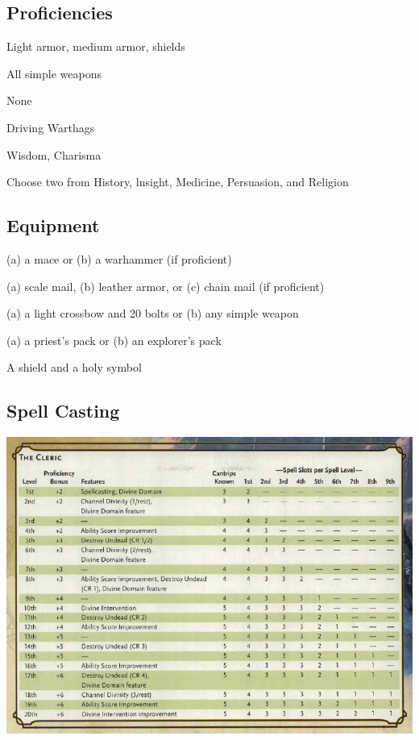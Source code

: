 \documentclass[letterpaper,10pt,twoside,twocolumn,openany]{book}
\begin{document}
\subsection{Proficiencies}

\begin{description}[font=\normalfont\textbf,noitemsep,topsep=1ex,leftmargin=1em]
	\item[Armor:] Light armor, medium armor, shields
	\item[Weapons:] All simple weapons
	\item[Tools:] None
	\item[Other:] Driving Warthags
\end{description}

\begin{description}[font=\normalfont\textbf,noitemsep,topsep=1ex,leftmargin=1em]
	\item[Saving Throws:] Wisdom, Charisma
	\item[Skills:] Choose two from History, lnsight, Medicine, Persuasion, and Religion
\end{description}

\subsection{Equipment}

\begin{description}
	\item (a) a mace or (b) a warhammer (if proficient)
	\item (a) scale mail, (b) leather armor, or (c) chain mail (if proficient)
	\item (a) a light crossbow and 20 bolts or (b) any simple weapon
	\item (a) a priest's pack or (b) an explorer's pack
	\item A shield and a holy symbol
\end{description}

\subsection{Spell Casting}

\begin{center}
	\includegraphics[width=\linewidth]{img/ClericTable.png}
\end{center}
\end{document}
